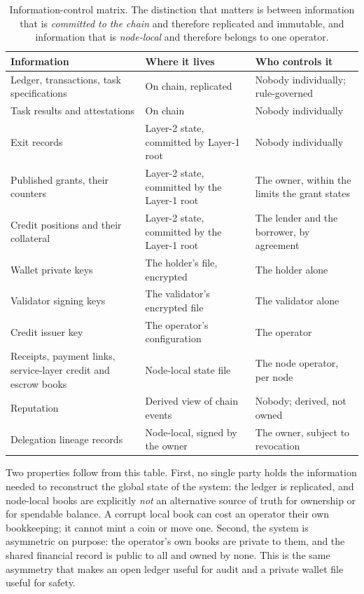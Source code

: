 \documentclass{article}
\begin{document}
\begin{table}[htbp]
\centering
\begin{tabular}{@{}p{}p{}p{}@{}}
\toprule
\textbf{Information} & \textbf{Where it lives} & \textbf{Who controls it} \\
\midrule
Ledger, transactions, task
  specifications & On chain, replicated & Nobody individually; rule-governed \\
Task results and attestations & On chain & Nobody individually \\
Exit records & Layer-2 state, committed by
  Layer-1 root & Nobody individually \\
Published grants, their counters & Layer-2 state, committed by
  the Layer-1 root & The owner, within the limits the grant states \\
Credit positions and their collateral & Layer-2 state, committed by
  the Layer-1 root & The lender and the borrower, by agreement \\
Wallet private keys & The holder's file, encrypted & The holder alone \\
Validator signing keys & The validator's encrypted file & The validator
  alone \\
Credit issuer key & The operator's configuration & The operator \\
Receipts, payment links, service-layer
  credit and escrow books & Node-local state file & The node operator, per node \\
Reputation & Derived view of chain events & Nobody; derived, not owned \\
Delegation lineage records & Node-local, signed by the owner & The owner,
  subject to revocation \\
\bottomrule
\end{tabular}
\caption{Information-control matrix. The distinction that matters is between
information that is \emph{committed to the chain} and therefore replicated and
immutable, and information that is \emph{node-local} and therefore belongs to
one operator.}
\label{tab:info}
\end{table}

Two properties follow from this table. First, no single party holds the
information needed to reconstruct the global state of the system: the ledger is
replicated, and node-local books are explicitly \emph{not} an alternative
source of truth for ownership or for spendable balance. A corrupt local book
can cost an operator their own bookkeeping; it cannot mint a coin or move one.
Second, the system is asymmetric on purpose: the operator's own books are
private to them, and the shared financial record is public to all and owned by
none. This is the same asymmetry that makes an open ledger useful for audit
and a private wallet file useful for safety.
\end{document}
